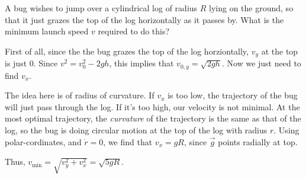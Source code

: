     \begin{example}
        A bug wishes to jump over a cylindrical log of radius $R$ lying on the ground, so that it just
        grazes the top of the log horizontally as it passes by. What is the minimum launch speed $v$
        required to do this?

        \begin{soln}
            First of all, since the the bug grazes the top of the log horziontally, $v_y$ at the top is just 
            $0$. Since $v^2 = v_0^2 - 2gh$, this implies that $v_{0,y} = \sqrt{2gh}$. Now we just need to find $v_x$.
            
            The idea here is of radius of curvature. If $v_x$ is too low, the
            trajectory of the bug will just pass through the log. If it's too high, our velocity is not minimal. 
            At the most optimal trajectory, the \emph{curvature} of the trajectory is the same as that of the log, so
            the bug is doing circular motion at the top of the log with radius $r$. Using polar-cordinates, and $\dot{r} = 0$, we find that 
            $v_x = gR$, since $\vec{g}$ points radially at top.

            Thus, $v_{\text{min}} = \sqrt{v_y^2 + v_x^2} = \sqrt{5gR}$.
        \end{soln}
    \end{example}

